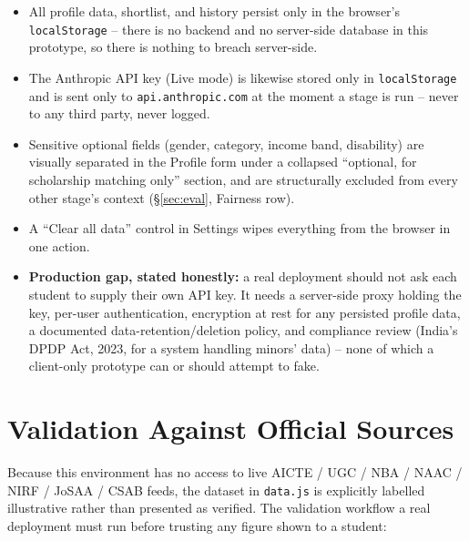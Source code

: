 \documentclass[11pt]{article}
\begin{document}
\begin{itemize}
\item All profile data, shortlist, and history persist only in the browser's \texttt{localStorage} -- there is no backend and no server-side database in this prototype, so there is nothing to breach server-side.
\item The Anthropic API key (Live mode) is likewise stored only in \texttt{localStorage} and is sent only to \texttt{api.anthropic.com} at the moment a stage is run -- never to any third party, never logged.
\item Sensitive optional fields (gender, category, income band, disability) are visually separated in the Profile form under a collapsed ``optional, for scholarship matching only'' section, and are structurally excluded from every other stage's context (\S\ref{sec:eval}, Fairness row).
\item A ``Clear all data'' control in Settings wipes everything from the browser in one action.
\item \textbf{Production gap, stated honestly:} a real deployment should not ask each student to supply their own API key. It needs a server-side proxy holding the key, per-user authentication, encryption at rest for any persisted profile data, a documented data-retention/deletion policy, and compliance review (India's DPDP Act, 2023, for a system handling minors' data) -- none of which a client-only prototype can or should attempt to fake.
\end{itemize}

\section{Validation Against Official Sources}
\label{sec:validation}

Because this environment has no access to live AICTE / UGC / NBA / NAAC / NIRF / JoSAA / CSAB feeds, the dataset in \texttt{data.js} is explicitly labelled illustrative rather than presented as verified. The validation workflow a real deployment must run before trusting any figure shown to a student:
\end{document}
